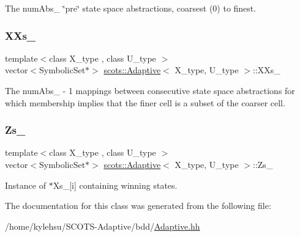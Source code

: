 The num\+Abs\+\_\+ \char`\"{}pre\char`\"{} state space abstractions, coarsest (0) to finest. \mbox{\label{classscots_1_1Adaptive_a3c52621889e3ea22c888c93cd14e5a76}} 
\subsubsection{\texorpdfstring{X\+Xs\+\_\+}{XXs\_}}
{\footnotesize\ttfamily template$<$class X\+\_\+type , class U\+\_\+type $>$ \\
vector$<$Symbolic\+Set$\ast$$>$ \hyperlink{classscots_1_1Adaptive}{scots\+::\+Adaptive}$<$ X\+\_\+type, U\+\_\+type $>$\+::X\+Xs\+\_\+}

The num\+Abs\+\_\+ -\/ 1 mappings between consecutive state space abstractions for which membership implies that the finer cell is a subset of the coarser cell. \mbox{\label{classscots_1_1Adaptive_a387e00a300c8c75d3a4eb6181dfab9c4}} 
\subsubsection{\texorpdfstring{Zs\+\_\+}{Zs\_}}
{\footnotesize\ttfamily template$<$class X\+\_\+type , class U\+\_\+type $>$ \\
vector$<$Symbolic\+Set$\ast$$>$ \hyperlink{classscots_1_1Adaptive}{scots\+::\+Adaptive}$<$ X\+\_\+type, U\+\_\+type $>$\+::Zs\+\_\+}

Instance of $\ast$\+Xs\+\_\+\mbox{[}i\mbox{]} containing winning states. 

The documentation for this class was generated from the following file\+:\begin{DoxyCompactItemize}
\item 
/home/kylehsu/\+S\+C\+O\+T\+S-\/\+Adaptive/bdd/\hyperlink{Adaptive_8hh}{Adaptive.\+hh}\end{DoxyCompactItemize}
